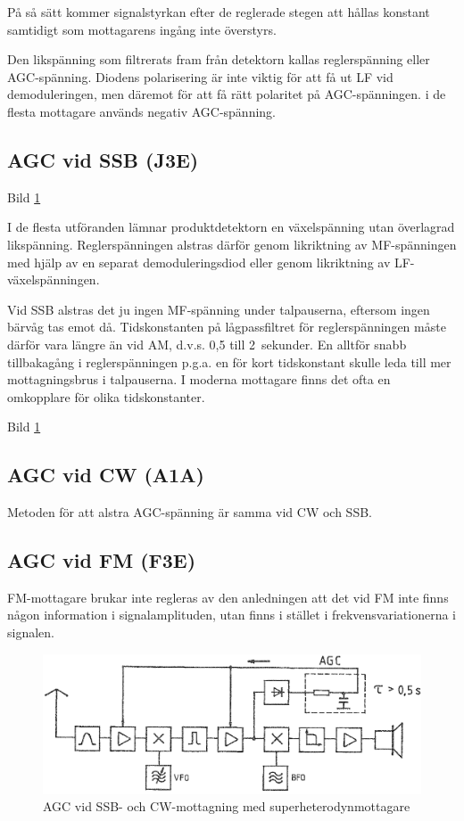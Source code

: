 På så sätt kommer signalstyrkan efter de reglerade stegen att hållas
konstant samtidigt som mottagarens ingång inte överstyrs.

Den likspänning som filtrerats fram från detektorn kallas
reglerspänning eller AGC-spänning. Diodens polarisering är inte viktig
för att få ut LF vid demoduleringen, men däremot för att få rätt
polaritet på AGC-spänningen. i de flesta mottagare används negativ
AGC-spänning.

\subsection{AGC vid SSB (J3E)}

Bild \ref{fig:bildII4-21}

I de flesta utföranden lämnar produktdetektorn en växelspänning utan
överlagrad likspänning. Reglerspänningen alstras därför genom
likriktning av MF-spänningen med hjälp av en separat demoduleringsdiod
eller genom likriktning av LF-växelspänningen.

Vid SSB alstras det ju ingen MF-spänning under talpauserna, eftersom
ingen bärvåg tas emot då.
Tidskonstanten på lågpassfiltret för reglerspänningen måste därför vara längre
än vid AM, d.v.s. 0,5 till 2~sekunder.
En alltför snabb tillbakagång i reglerspänningen p.g.a. en för kort
tidskonstant skulle leda till mer mottagningsbrus i talpauserna.
I moderna mottagare finns det ofta en omkopplare för olika tidskonstanter.

Bild \ref{fig:bildII4-21}

\subsection{AGC vid CW (A1A)}

Metoden för att alstra AGC-spänning är samma vid CW och SSB.

\subsection{AGC vid FM (F3E)}

FM-mottagare brukar inte regleras av den anledningen att det vid FM
inte finns någon information i signalamplituden, utan finns i stället
i frekvensvariationerna i signalen.

\begin{figure}
  \includegraphics[width=\textwidth]{images/bild_2_4-21.png}
  \caption{AGC vid SSB- och CW-mottagning med superheterodynmottagare}
  \label{fig:bildII4-21}
\end{figure}


